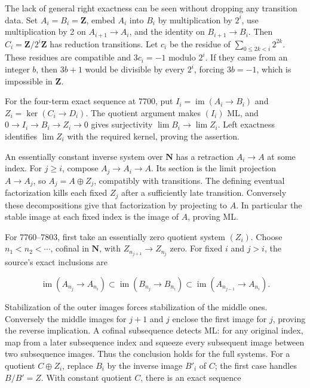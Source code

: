 \documentclass[11pt]{article}
\begin{document}
The lack of general right exactness can be seen without dropping any transition data. Set \(A_i=B_i=\mathbf Z\), embed \(A_i\) into \(B_i\) by multiplication by \(2^i\), use multiplication by 2 on \(A_{i+1}\to A_i\), and the identity on \(B_{i+1}\to B_i\). Then \(C_i=\mathbf Z/2^i\mathbf Z\) has reduction transitions. Let \(c_i\) be the residue of \(\sum_{0\leq 2k<i}2^{2k}\). These residues are compatible and \(3c_i=-1\) modulo \(2^i\). If they came from an integer \(b\), then \(3b+1\) would be divisible by every \(2^i\), forcing \(3b=-1\), which is impossible in \(\mathbf Z\).

For the four-term exact sequence at 7700, put \(I_i=\operatorname{im}(A_i\to B_i)\) and \(Z_i=\ker(C_i\to D_i)\). The quotient argument makes \((I_i)\) ML, and \(0\to I_i\to B_i\to Z_i\to0\) gives surjectivity \(\lim B_i\to\lim Z_i\). Left exactness identifies \(\lim Z_i\) with the required kernel, proving the assertion.

An essentially constant inverse system over \(\mathbf N\) has a retraction \(A_i\to A\) at some index. For \(j\geq i\), compose \(A_j\to A_i\to A\). Its section is the limit projection \(A\to A_j\), so \(A_j=A\oplus Z_j\), compatibly with transitions. The defining eventual factorization kills each fixed \(Z_j\) after a sufficiently late transition. Conversely these decompositions give that factorization by projecting to \(A\). In particular the stable image at each fixed index is the image of \(A\), proving ML.

For 7760--7803, first take an essentially zero quotient system \((Z_i)\). Choose \(n_1<n_2<\cdots\), cofinal in \(\mathbf N\), with \(Z_{n_{j+1}}\to Z_{n_j}\) zero. For fixed \(i\) and \(j>i\), the source's exact inclusions are

\[
\operatorname{im}(A_{n_j}\to A_{n_i})
\subset\operatorname{im}(B_{n_j}\to B_{n_i})
\subset\operatorname{im}(A_{n_{j-1}}\to A_{n_i}).
\]

Stabilization of the outer images forces stabilization of the middle ones. Conversely the middle images for \(j+1\) and \(j\) enclose the first image for \(j\), proving the reverse implication. A cofinal subsequence detects ML: for any original index, map from a later subsequence index and squeeze every subsequent image between two subsequence images. Thus the conclusion holds for the full systems. For a quotient \(C\oplus Z_i\), replace \(B_i\) by the inverse image \(B'_i\) of \(C\); the first case handles \(B/B'=Z\). With constant quotient \(C\), there is an exact sequence
\end{document}
